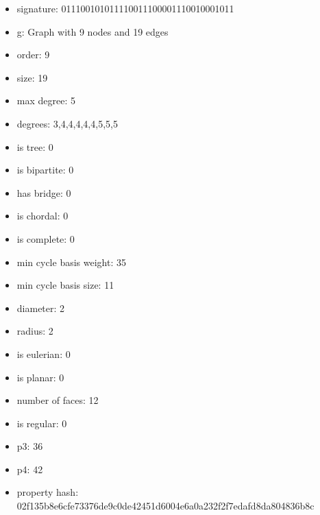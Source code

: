 \newpage
\begin{figure}
\end{figure}
\begin{itemize}
\item signature: 011100101011110011100001110010001011
\item g: Graph with 9 nodes and 19 edges
\item order: 9
\item size: 19
\item max degree: 5
\item degrees: 3,4,4,4,4,4,5,5,5
\item is tree: 0
\item is bipartite: 0
\item has bridge: 0
\item is chordal: 0
\item is complete: 0
\item min cycle basis weight: 35
\item min cycle basis size: 11
\item diameter: 2
\item radius: 2
\item is eulerian: 0
\item is planar: 0
\item number of faces: 12
\item is regular: 0
\item p3: 36
\item p4: 42
\item property hash: 02f135b8e6cfe73376de9c0de42451d6004e6a0a232f2f7edafd8da804836b8c
\end{itemize}
